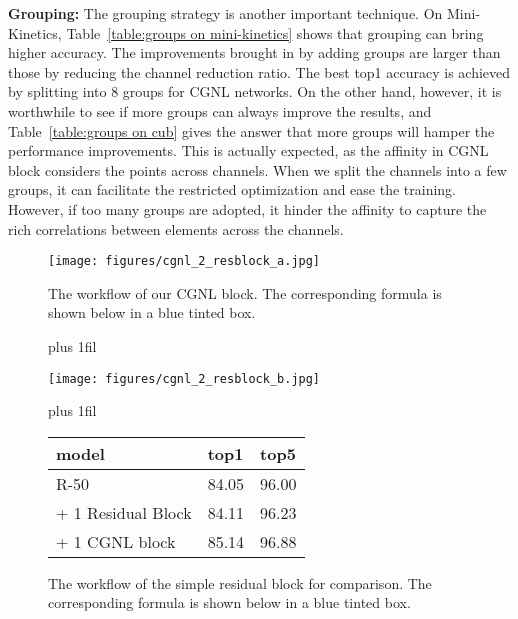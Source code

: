 \documentclass{article}
\begin{document}
\textbf{Grouping:}
The grouping strategy is another important technique.
On Mini-Kinetics, Table~\ref{table:groups on mini-kinetics} shows that grouping can bring higher accuracy.
The improvements brought in by adding groups are larger than those by reducing the channel reduction ratio.
The best top1 accuracy is achieved by splitting into 8 groups for CGNL networks.
On the other hand, however, it is worthwhile to see if more groups can always improve the results, and Table~\ref{table:groups on cub} gives the answer that more groups will hamper the performance improvements.
This is actually expected, as the affinity in CGNL block considers the points across channels. When we split the channels into a few groups, it can facilitate the restricted optimization and ease the training.
However, if too many groups are adopted, it hinder the affinity to capture the rich correlations between elements across the channels.
\begin{figure}[ht]
  \begin{minipage}[]{0.32\textwidth}
    \centering
    \texttt{[image: figures/cgnl\_2\_resblock\_a.jpg]}
    \caption{\small{
      The workflow of our CGNL block.
      The corresponding formula is shown below in a blue tinted box.
    }}
    \label{fig:cgnl_2_resblock_a}
  \end{minipage}
  \hskip 3pt plus 1fil
  \begin{minipage}[]{0.32\textwidth}
    \centering
    \texttt{[image: figures/cgnl\_2\_resblock\_b.jpg]}
    \caption{\small{
      The workflow of the simple residual block for comparison.
      The corresponding formula is shown below in a blue tinted box.
    }}
    \label{fig:cgnl_2_resblock_b}
  \end{minipage}
  \hskip 3pt plus 1fil
  \begin{minipage}[h]{0.3\textwidth}
    \centering
    \scriptsize
    \begin{tabular}[t]{lll}
    \toprule
    model                     & top1    & top5    \\
    \midrule
    R-50                      & 84.05   & 96.00   \\
    \cmidrule(r){2-3}
    + 1 Residual Block        & 84.11   & 96.23   \\
    + 1 CGNL block            & 85.14   & 96.88   \\
    \bottomrule
    \end{tabular}
    \label{table:cgnl_2_resblock}
  \end{minipage}
\end{figure}
\end{document}
